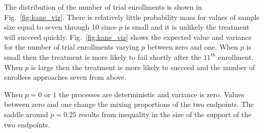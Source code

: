 \documentclass[12pt]{article}
\begin{document}
The distribution of the number of trial enrollments is shown in 
Fig.~\ref{fig:kane_viz}. There is relatively little probability mass
for values of sample size equal to seven through 10 since $p$ is small and it 
is unlikely the treatment will succeed quickly.
Fig.~\ref{fig:kane_viz} shows the expected value and variance for the
number of trial enrollments varying $p$ between zero and one. When $p$ is
small then the treatment
is more likely to fail shortly after the $11^{\text{th}}$ enrollment.
When $p$ is large then the treatment is more likely to succeed and the 
number of enrollees approaches seven from above. 

When $p=0$ or $1$ the processes are deterministic and variance is zero.
Values between zero and one change the mixing proportions of 
the two endpoints. The saddle around $p=0.25$ results from inequality 
in the size of the support of the two endpoints.

\end{document}
